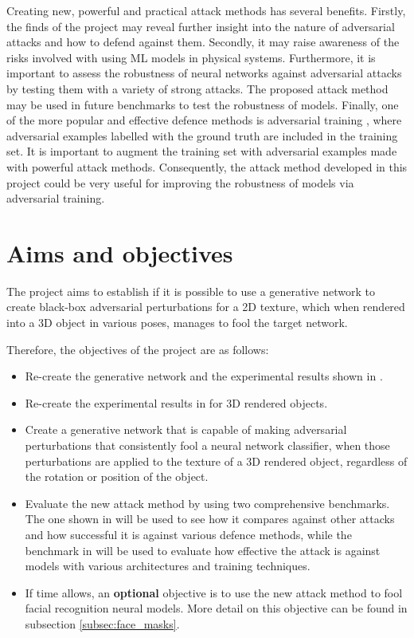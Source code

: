 \documentclass[11pt, a4paper, oneside]{article}
\begin{document}
Creating new, powerful and practical attack methods has several benefits. Firstly, the finds of the project may reveal further insight into the nature of adversarial attacks and how to defend against them. Secondly, it may raise awareness of the risks involved with using ML models in physical systems. Furthermore, it is important to assess the robustness of neural networks against adversarial attacks by testing them with a variety of strong attacks. The proposed attack method may be used in future benchmarks to test the robustness of models. Finally, one of the more popular and effective defence methods is adversarial training \cite{dong2020benchmarking}, where adversarial examples labelled with the ground truth are included in the training set. It is important to augment the training set with adversarial examples made with powerful attack methods. Consequently, the attack method developed in this project could be very useful for improving the robustness of models via adversarial training.

\section{Aims and objectives}
    \label{sec:aims_objectives}

The project aims to establish if it is possible to use a generative network to create black-box adversarial perturbations for a 2D texture, which when rendered into a 3D object in various poses, manages to fool the target network. 

Therefore, the objectives of the project are as follows:

\begin{itemize}
    \item Re-create the generative network and the experimental results shown in \cite{zheng_black_box_GAN}.
    \item Re-create the experimental results in \cite{athalye} for 3D rendered objects.
    \item Create a generative network that is capable of making adversarial perturbations that consistently fool a neural network classifier, when those perturbations are applied to the texture of a 3D rendered object, regardless of the rotation or position of the object.
    \item Evaluate the new attack method by using two comprehensive benchmarks. The one shown in \cite{dong2020benchmarking} will be used to see how it compares against other attacks and how successful it is against various defence methods, while the benchmark in \cite{robustart} will be used to evaluate how effective the attack is against models with various architectures and training techniques.
    \item If time allows, an \textbf{optional} objective is to use the new attack method to fool facial recognition neural models. More detail on this objective can be found in subsection \ref{subsec:face_masks}.
\end{itemize}
\end{document}
